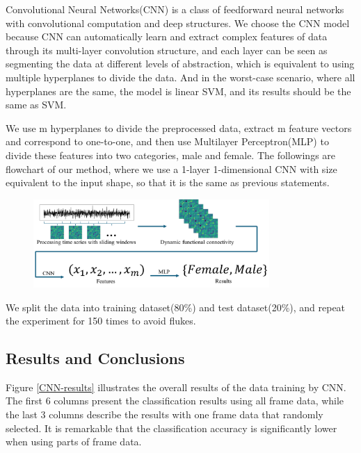 \documentclass[11pt]{article}
\begin{document}
Convolutional Neural Networks(CNN) is a class of feedforward neural networks with convolutional computation and deep structures. We choose the CNN model because CNN can automatically learn and extract complex features of data through its multi-layer convolution structure, and each layer can be seen as segmenting the data at different levels of abstraction, which is equivalent to using multiple hyperplanes to divide the data. And in the worst-case scenario, where all hyperplanes are the same, the model is linear SVM, and its results should be the same as SVM.

We use m hyperplanes to divide the preprocessed data, extract m feature vectors and correspond to one-to-one, and then use Multilayer Perceptron(MLP) to divide these features into two categories, male and female. The followings are flowchart of our method, where we use a 1-layer 1-dimensional CNN with size equivalent to the input shape, so that it is the same as previous statements.

\begin{figure}[H]
    \centering
    \includegraphics[width=0.8\textwidth]{./figure/method.png}
    \label{figure-CNN-model}
\end{figure}

We split the data into training dataset(80\%) and test dataset(20\%), and repeat the experiment for 150 times to avoid flukes.

\subsection{Results and Conclusions}

Figure \ref{CNN-results} illustrates the overall results of the data training by CNN. The first 6 columns present the classification results using all frame data, while the last 3 columns describe the results with one frame data that randomly selected. It is remarkable that the classification accuracy is significantly lower when using parts of frame data.
\end{document}
